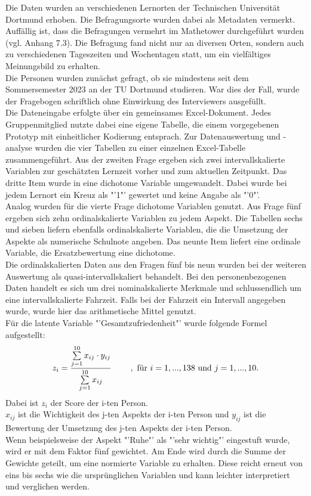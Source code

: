 \documentclass[11pt, a4paper]{article}
\begin{document}
\vspace{-0.15cm}
Die Daten wurden an verschiedenen Lernorten der Technischen Universität Dortmund erhoben. Die Befragungsorte wurden dabei als Metadaten vermerkt. Auffällig ist, dass die Befragungen vermehrt im Mathetower durchgeführt wurden (vgl. Anhang 7.3). Die Befragung fand nicht nur an diversen Orten, sondern auch zu verschiedenen Tageszeiten und Wochentagen statt, um ein vielfältiges Meinungsbild zu erhalten.\\
Die Personen wurden zunächst gefragt, ob sie mindestens seit dem Sommersemester 2023 an der TU Dortmund studieren. War dies der Fall, wurde der Fragebogen schriftlich ohne Einwirkung des Interviewers ausgefüllt.\\
Die Dateneingabe erfolgte über ein gemeinsames Excel-Dokument. Jedes Gruppenmitglied nutzte dabei eine eigene Tabelle, die einem vorgegebenen Prototyp mit einheitlicher Kodierung entsprach. Zur Datenauswertung und -analyse wurden die vier Tabellen zu einer einzelnen Excel-Tabelle zusammengeführt. Aus der zweiten Frage ergeben sich zwei intervallskalierte Variablen zur geschätzten Lernzeit vorher und zum aktuellen Zeitpunkt. Das dritte Item wurde in eine dichotome Variable umgewandelt. Dabei wurde bei jedem Lernort ein Kreuz als "'1"' gewertet und keine Angabe als "'0"'. \\
Analog wurden für die vierte Frage dichotome Variablen genutzt. Aus Frage fünf ergeben sich zehn ordinalskalierte Variablen zu jedem Aspekt. Die Tabellen sechs und sieben liefern ebenfalls ordinalskalierte Variablen, die die Umsetzung der Aspekte als numerische Schulnote angeben. Das neunte Item liefert eine ordinale Variable, die Ersatzbewertung eine dichotome.\\
Die ordinalskalierten Daten aus den Fragen fünf bis neun wurden bei der weiteren Auswertung als quasi-intervallskaliert behandelt. Bei den personenbezogenen Daten handelt es sich um drei nominalskalierte Merkmale und schlussendlich um eine intervallskalierte Fahrzeit. Falls bei der Fahrzeit ein Intervall angegeben wurde, wurde hier das arithmetische Mittel genutzt. \\

\vspace{-0.18cm}
Für die latente Variable "'Gesamtzufriedenheit"' wurde folgende Formel aufgestellt:
\begin{equation*}
	z_i = \frac{\sum\limits_{j=1}^{10}x_{ij}\cdot  y_{ij}}{\sum\limits_{j=1}^{10}x_{ij}} \hspace{0.8cm} ,\  \text{für} \ 
	i=1,...,138\  \text{und} \ j=1,...,10.
	\vspace{0.15cm}
\end{equation*} 
Dabei ist $z_i$ der Score der i-ten Person. \\
$x_{ij}$ ist die Wichtigkeit des j-ten Aspekts der i-ten Person und
$y_{ij}$ ist die Bewertung der Umsetzung des j-ten Aspekts der i-ten Person.\\
 Wenn beispielsweise der Aspekt "'Ruhe"' als "'sehr wichtig"' eingestuft wurde, wird er mit dem Faktor fünf gewichtet. Am Ende wird durch die Summe der Gewichte geteilt, um eine normierte Variable zu erhalten.  Diese reicht erneut von eins bis sechs wie die ursprünglichen Variablen und kann leichter interpretiert und verglichen werden.
\end{document}
